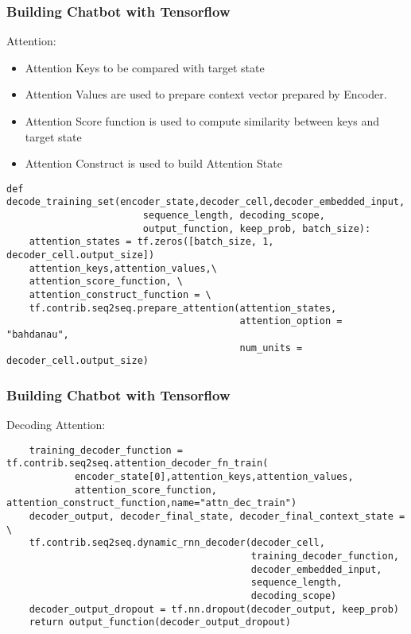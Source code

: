 \begin{frame}[fragile]\frametitle{Building Chatbot with Tensorflow}
Attention:
\begin{itemize}
\item Attention Keys to be compared with target state
\item Attention Values are used to prepare context vector prepared by Encoder.
\item Attention Score function is used to compute similarity between keys and target state
\item Attention Construct is used to build Attention State
\end{itemize}

\begin{lstlisting}
def decode_training_set(encoder_state,decoder_cell,decoder_embedded_input,
                        sequence_length, decoding_scope, 
                        output_function, keep_prob, batch_size):
    attention_states = tf.zeros([batch_size, 1, decoder_cell.output_size])
    attention_keys,attention_values,\
    attention_score_function, \
    attention_construct_function = \
    tf.contrib.seq2seq.prepare_attention(attention_states,
                                         attention_option = "bahdanau",
                                         num_units = decoder_cell.output_size)
\end{lstlisting}

\end{frame}

\begin{frame}[fragile]\frametitle{Building Chatbot with Tensorflow}
Decoding Attention:
\begin{lstlisting}
    training_decoder_function = tf.contrib.seq2seq.attention_decoder_fn_train(
            encoder_state[0],attention_keys,attention_values,
            attention_score_function, attention_construct_function,name="attn_dec_train")
    decoder_output, decoder_final_state, decoder_final_context_state = \
    tf.contrib.seq2seq.dynamic_rnn_decoder(decoder_cell,
                                           training_decoder_function,
                                           decoder_embedded_input,
                                           sequence_length,
                                           decoding_scope)
    decoder_output_dropout = tf.nn.dropout(decoder_output, keep_prob)
    return output_function(decoder_output_dropout)                                                              
\end{lstlisting}

\end{frame}

